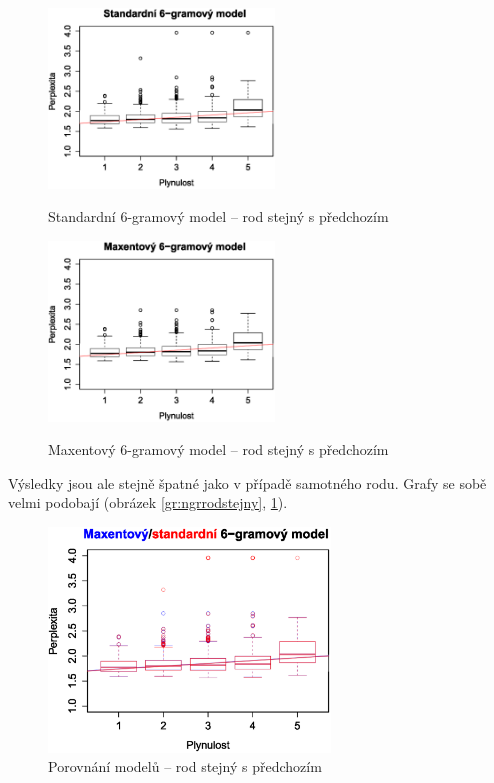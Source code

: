 \documentclass[12pt,a4paper]{report}
\begin{document}
\begin{figure}[!htb]
\begin{center}
  \centering\includegraphics[width=60mm]{./grafy/morf/ngram/rodstejny.eps}
  \caption{Standardní 6-gramový model -- rod stejný s předchozím}\label{gr:ngrrodstejny}
\endminipage\quad
{}
  \centering\includegraphics[width=60mm]{./grafy/morf/maxent/rodstejny.eps}
  \caption{Maxentový 6-gramový model -- rod stejný s předchozím}\label{gr:maxrodstejny}
\endminipage
\end{center}
\end{figure}

Výsledky jsou ale stejně špatné jako v případě samotného rodu. Grafy se sobě velmi podobají (obrázek \ref{gr:ngrrodstejny}, \ref{gr:maxrodstejny}).

\begin{figure}[!htbp]
\begin{center}
	\centering
	\includegraphics[width=75mm]{./grafy/morf/porovnani/rodstejny.eps}	
	\caption{Porovnání modelů -- rod stejný s předchozím}\label{gr:porrodstejny}
\endminipage
\end{center}
\end{figure}
\end{document}
